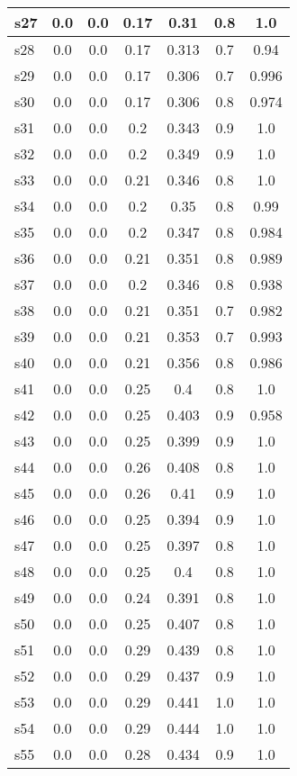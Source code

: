 \documentclass{article}
\begin{document}
\begin{tabular}{|l|c|c|c|c|c|c|}
\hline
s27 &0.0 & 0.0 & 0.17 & 0.31 & 0.8 & 1.0\\
\hline
s28 &0.0 & 0.0 & 0.17 & 0.313 & 0.7 & 0.94\\
\hline
s29 &0.0 & 0.0 & 0.17 & 0.306 & 0.7 & 0.996\\
\hline
s30 &0.0 & 0.0 & 0.17 & 0.306 & 0.8 & 0.974\\
\hline
s31 &0.0 & 0.0 & 0.2 & 0.343 & 0.9 & 1.0\\
\hline
s32 &0.0 & 0.0 & 0.2 & 0.349 & 0.9 & 1.0\\
\hline
s33 &0.0 & 0.0 & 0.21 & 0.346 & 0.8 & 1.0\\
\hline
s34 &0.0 & 0.0 & 0.2 & 0.35 & 0.8 & 0.99\\
\hline
s35 &0.0 & 0.0 & 0.2 & 0.347 & 0.8 & 0.984\\
\hline
s36 &0.0 & 0.0 & 0.21 & 0.351 & 0.8 & 0.989\\
\hline
s37 &0.0 & 0.0 & 0.2 & 0.346 & 0.8 & 0.938\\
\hline
s38 &0.0 & 0.0 & 0.21 & 0.351 & 0.7 & 0.982\\
\hline
s39 &0.0 & 0.0 & 0.21 & 0.353 & 0.7 & 0.993\\
\hline
s40 &0.0 & 0.0 & 0.21 & 0.356 & 0.8 & 0.986\\
\hline
s41 &0.0 & 0.0 & 0.25 & 0.4 & 0.8 & 1.0\\
\hline
s42 &0.0 & 0.0 & 0.25 & 0.403 & 0.9 & 0.958\\
\hline
s43 &0.0 & 0.0 & 0.25 & 0.399 & 0.9 & 1.0\\
\hline
s44 &0.0 & 0.0 & 0.26 & 0.408 & 0.8 & 1.0\\
\hline
s45 &0.0 & 0.0 & 0.26 & 0.41 & 0.9 & 1.0\\
\hline
s46 &0.0 & 0.0 & 0.25 & 0.394 & 0.9 & 1.0\\
\hline
s47 &0.0 & 0.0 & 0.25 & 0.397 & 0.8 & 1.0\\
\hline
s48 &0.0 & 0.0 & 0.25 & 0.4 & 0.8 & 1.0\\
\hline
s49 &0.0 & 0.0 & 0.24 & 0.391 & 0.8 & 1.0\\
\hline
s50 &0.0 & 0.0 & 0.25 & 0.407 & 0.8 & 1.0\\
\hline
s51 &0.0 & 0.0 & 0.29 & 0.439 & 0.8 & 1.0\\
\hline
s52 &0.0 & 0.0 & 0.29 & 0.437 & 0.9 & 1.0\\
\hline
s53 &0.0 & 0.0 & 0.29 & 0.441 & 1.0 & 1.0\\
\hline
s54 &0.0 & 0.0 & 0.29 & 0.444 & 1.0 & 1.0\\
\hline
s55 &0.0 & 0.0 & 0.28 & 0.434 & 0.9 & 1.0\\

\end{tabular}
\end{document}
